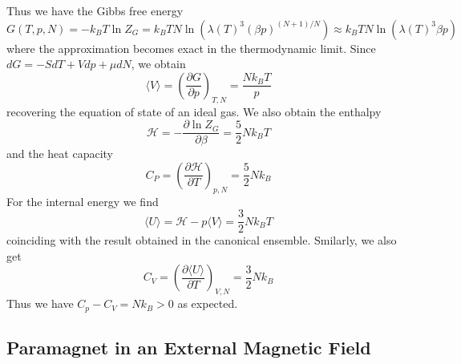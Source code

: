 \documentclass[12pt, a4paper, oneside, openright, titlepage]{book}
\begin{document}
Thus we have the Gibbs free energy \begin{equation*}
    G(T,p,N) = -k_BT\ln Z_G = k_BTN\ln(\lambda(T)^3(\beta p)^{(N+1)/N}) \approx k_BTN\ln (\lambda(T)^3\beta p)
\end{equation*}
where the approximation becomes exact in the thermodynamic limit. Since $dG = -SdT + Vdp + \mu dN$, we obtain \begin{equation*}
    \langle V\rangle = \left(\frac{\partial G}{\partial p}\right)_{T,N} = \frac{Nk_BT}{p}
\end{equation*}
recovering the equation of state of an ideal gas. We also obtain the enthalpy \begin{equation*}
    \mathcal{H} = -\frac{\partial \ln Z_G}{\partial \beta} = \frac{5}{2}Nk_BT
\end{equation*}
and the heat capacity \begin{equation*}
    C_P = \left(\frac{\partial\mathcal{H}}{\partial T}\right)_{p,N} = \frac{5}{2}Nk_B
\end{equation*}
For the internal energy we find \begin{equation*}
    \langle U\rangle = \mathcal{H} - p\langle V\rangle = \frac{3}{2}Nk_BT
\end{equation*}
coinciding with the result obtained in the canonical ensemble. Smilarly, we also get \begin{equation*}
    C_V = \left(\frac{\partial \langle U\rangle}{\partial T}\right)_{V,N} = \frac{3}{2}Nk_B
\end{equation*}
Thus we have $C_p - C_V = Nk_B > 0 $ as expected.

\subsection{Paramagnet in an External Magnetic Field}
\end{document}
